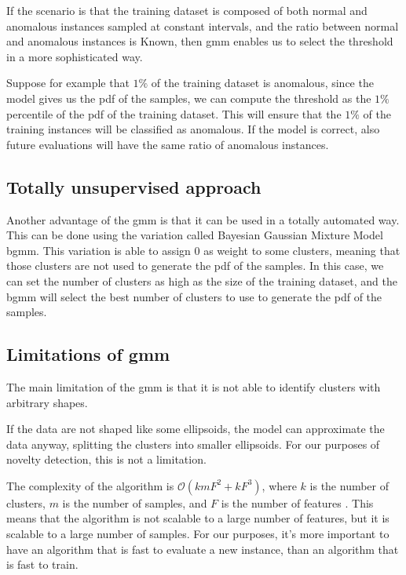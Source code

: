 If the scenario is that the training dataset is composed of both normal and anomalous instances sampled at constant intervals, and the ratio between normal and anomalous instances is Known, then \gls{gmm} enables us to select the threshold in a more sophisticated way.

Suppose for example that $1\%$ of the training dataset is anomalous, since the model gives us the \gls{pdf} of the samples, we can compute the threshold as the $1\%$ percentile of the \gls{pdf} of the training dataset. This will ensure that the $1\%$ of the training instances will be classified as anomalous. If the model is correct, also future evaluations will have the same ratio of anomalous instances.

\subsection{Totally unsupervised approach}
\label{sec:gauss_unsupervised}
Another advantage of the \gls{gmm} is that it can be used in a totally automated way. This can be done using the variation called Bayesian Gaussian Mixture Model \gls{bgmm}. This variation is able to assign $0$ as 
weight to some clusters, meaning that those clusters are not used to generate the \gls{pdf} of the samples. In this case, we can set the number of clusters as high as the size of the training dataset, and the \gls{bgmm} will select the best number of clusters to use to generate the \gls{pdf} of the samples. 

\subsection{Limitations of \gls{gmm}}
The main limitation of the \gls{gmm} is that it is not able to identify clusters with arbitrary shapes.

If the data are not shaped like some ellipsoids, the model can approximate the data anyway, splitting the clusters into smaller ellipsoids. For our purposes of novelty detection, this is not a limitation.

The complexity of the algorithm is $\mathcal{O}(kmF^2+kF^3)$, where $k$ is the number of clusters, $m$ is the number of samples, and $F$ is the number of features . This means that the algorithm is not scalable to a large number of features, but it is scalable to a large number of samples.
For our purposes, it's more important to have an algorithm that is fast to evaluate a new instance, than an algorithm that is fast to train.
